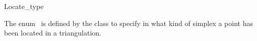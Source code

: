 \ccModifierCrossRefOff
\begin{ccRefEnum}[Triangulation::]{Locate_type}

\ccDefinition
  
The enum \ccRefName\ is defined by the class  to specify 
in what kind of simplex a point has been located in a triangulation.

{}

\ccSeeAlso


\end{ccRefEnum}
\ccModifierCrossRefOn
